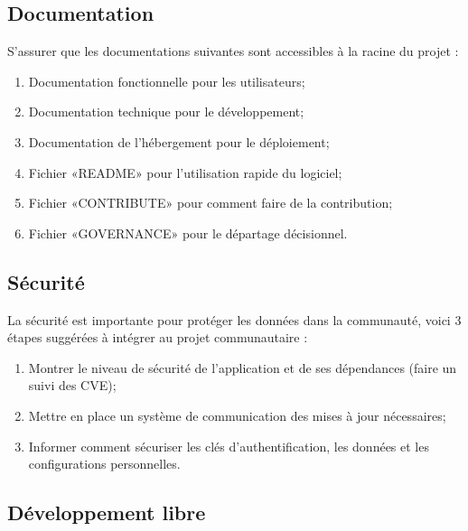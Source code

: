 \subsection{Documentation}

S'assurer que les documentations suivantes sont accessibles à la racine du projet :
\begin{enumerate}
    \item Documentation fonctionnelle pour les utilisateurs;
    \item Documentation technique pour le développement;
    \item Documentation de l'hébergement pour le déploiement;
    \item Fichier «README» pour l'utilisation rapide du logiciel;
    \item Fichier «CONTRIBUTE» pour comment faire de la contribution;
    \item Fichier «GOVERNANCE» pour le départage décisionnel.
\end{enumerate}

\subsection{Sécurité}
La sécurité est importante pour protéger les données dans la communauté, voici 3 étapes suggérées à intégrer au projet communautaire :
\begin{enumerate}
    \item Montrer le niveau de sécurité de l'application et de ses dépendances (faire un suivi des CVE);
    \item Mettre en place un système de communication des mises à jour nécessaires;
    \item Informer comment sécuriser les clés d'authentification, les données et les configurations personnelles.
\end{enumerate}

\subsection{Développement libre}

